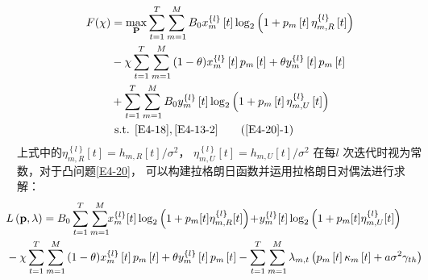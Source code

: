 \begin{align} \notag
F(\chi)&=  \max _{ \mathbf{P}} \sum_{t=1}^T \sum_{m=1}^M {B}_{0}x_{m}^{\left\{ l \right\}}\left[ t \right] %
\log_2{\left(1+p_m\left[t\right]\eta_{m,R}^{\left\{ l \right\}}\left[t\right]\right)}                         \\       \label{E4-20}
& -\chi \sum_{t=1}^T \sum_{m=1}^M{(1-\theta)x_{m}^{\left\{ l \right\}}\left[ t \right]p_m\left[t\right]
+\theta y_{m}^{\left\{ l \right\}}\left[ t \right]p_m\left[t\right]}                           \\ \notag
& + \sum_{t=1}^T \sum_{m=1}^M {B}_{0}y_{m}^{\left\{ l \right\}}\left[ t \right]
\log_2{\left(1+p_m\left[t\right]\eta_{m,U}^{\left\{ l \right\}}\left[t\right]\right)}                                          \\ \notag
&\text { s.t. }
 \eqref{E4-18},\eqref{E4-13-2}                                                           \tag{\ref{E4-20}{-1}}       \label{E4-20-1}
\end{align}
上式中的$\eta_{m,R}^{\left\{ l \right\}}\left[t\right]=h_{m,R}\left[t\right]/{\sigma^2}$，
$\eta_{m,U}^{\left\{ l \right\}}\left[t\right]=h_{m,U}\left[t\right]/{\sigma^2}$
在每$l$ 次迭代时视为常数，对于凸问题\eqref{E4-20}，
可以构建拉格朗日函数并运用拉格朗日对偶法进行求解：
\begin{align} \label{E4-21}
&\!\!\!\!\!\!L\left(\mathbf{p},\lambda\right)=B_{0}\sum_{t=1}^{T} \sum_{m=1}^{M}  \!\! x_{m}^{\{ l \}}[t] \log_{2}\left(1 + p_{m}[t]\eta_{m,R}^{\{ l \}}[t]\right) \! +\!  y_{m}^{\{ l \}}[t] \log_{2}\left(1 + p_{m}[t]\eta_{m,U}^{\{ l \}}[t]\right)  \\
&\!\!\!\!\!\!-\chi \sum_{t=1}^T \sum_{m=1}^M{(1-\theta)x_{m}^{\left\{ l \right\}}\left[ t \right]p_m\left[t\right]
+\theta y_{m}^{\left\{ l \right\}}\left[ t \right]p_m\left[t\right]} %
-\sum\limits_{t=1}^{T}{\sum\limits_{m=1}^{M}{{{\lambda }_{m,t}}}}\left( {{p}_{m}}\left[ t \right]{{\kappa }_{m}}\left[ t \right]+a{{\sigma }^{2}}{{\gamma }_{th}} \right) \notag
\end{align}

